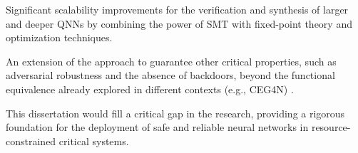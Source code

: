 Significant scalability improvements for the verification and synthesis of larger and deeper QNNs by combining the power of SMT with fixed-point theory and optimization techniques.

An extension of the approach to guarantee other critical properties, such as adversarial robustness and the absence of backdoors, beyond the functional equivalence already explored in different contexts (e.g., CEG4N) \cite{abdi2021counterexample}.

This dissertation would fill a critical gap in the research, providing a rigorous foundation for the deployment of safe and reliable neural networks in resource-constrained critical systems.
